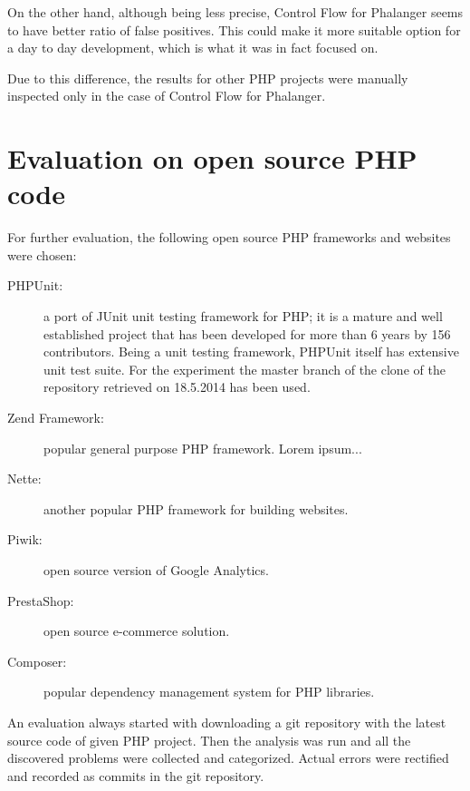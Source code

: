 On the other hand, although being less precise, Control Flow for 
Phalanger seems to have better ratio of false positives. 
This could make it more suitable option for a day to day development, 
which is what it was in fact focused on. 

Due to this difference, the results for other PHP projects were 
manually inspected only in the case of Control Flow for Phalanger.


\section{Evaluation on open source PHP code}

For further evaluation, the following open source PHP frameworks and 
websites were chosen:

\begin{description}
    \item[PHPUnit:] a port of JUnit unit testing framework for PHP; it is a mature 
    and well established project that has been developed for more than 6 years 
    by 156 contributors. Being a unit testing framework, PHPUnit itself has extensive 
    unit test suite. For the experiment the master branch of the clone of the 
    repository retrieved on 18.5.2014 has been used. 
    
    \item[Zend Framework:] popular general purpose PHP framework. Lorem ipsum...
        
    \item[Nette:] another popular PHP framework for building websites.
        
    \item[Piwik:] open source version of Google Analytics. 
    
    \item[PrestaShop:] open source e-commerce solution. 
    
    \item[Composer:] popular dependency management system for PHP libraries. 
\end{description}

An evaluation always started with downloading a git repository with the 
latest source code of given PHP project. Then the analysis was run and 
all the discovered problems were collected and categorized.
Actual errors were rectified and recorded as commits in the 
git repository. 

